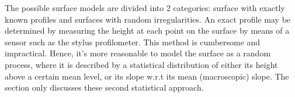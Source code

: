 The possible surface models are divided into 2 categories: surface with exactly known profiles and surfaces with random irregularities. An exact profile may be determined by measuring the height at each point on the surface by means of a sensor such as the stylus profilometer. This method is cumbersome and impractical. Hence, it’s more reasonable to model the surface as a random process, where it is described by a statistical distribution of either its height above a certain mean level, or its slope w.r.t its mean (macroscopic) slope. The section only discusses these second statistical approach.










